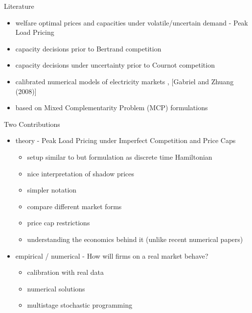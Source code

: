 \begin{frame}{Literature}

\begin{itemize}
	\item welfare optimal prices and capacities under volatile/uncertain demand - Peak Load Pricing \cite{Crew1986}
	\item capacity decisions prior to Bertrand competition \cite{Kreps1983}
	\item capacity decisions under uncertainty prior to Cournot competition \cite{Gabszewicz1997}
\end{itemize}

\begin{itemize}
	\item calibrated numerical models of electricity markets \cite{Genc2007}, [Gabriel and Zhuang (2008)]
	\item based on Mixed Complementarity Problem (MCP) formulations \cite{Ferris2000}
\end{itemize}

\end{frame}

\begin{frame}{Two Contributions}

\begin{itemize}

\item theory - Peak Load Pricing under Imperfect Competition and Price Caps	

\begin{itemize}
  \item setup similar to \cite{Gabszewicz1997} but formulation as discrete time Hamiltonian
	\item nice interpretation of shadow prices
	\item simpler notation
  \item compare different market forms
  \item price cap restrictions
  \item understanding the economics behind it (unlike recent numerical papers)
\end{itemize}

\item empirical / numerical - How will firms on a real market behave?

\begin{itemize}
	\item calibration with real data
	\item numerical solutions 
	\item multistage stochastic programming
\end{itemize}

\end{itemize}
\end{frame}


